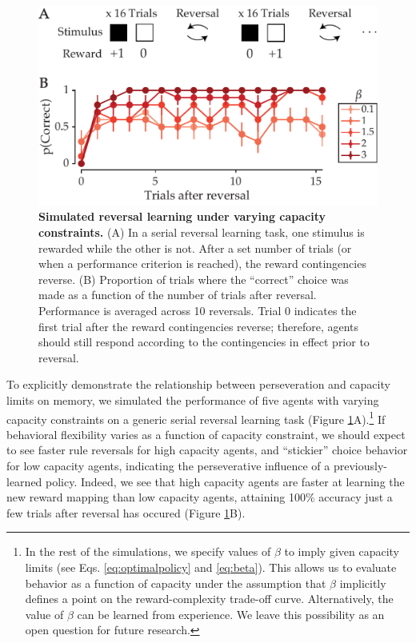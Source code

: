 \documentclass[11pt]{article}
\begin{document}
\begin{figure}
    \centering
    \includegraphics[width=350pt]{figs/reversal.pdf}
    \caption{\textbf{Simulated reversal learning under varying capacity constraints.} (A) In a serial reversal learning task, one stimulus is rewarded while the other is not. After a set number of trials (or when a performance criterion is reached), the reward contingencies reverse. (B) Proportion of trials where the ``correct'' choice was made as a function of the number of trials after reversal. Performance is averaged across 10 reversals. Trial 0 indicates the first trial after the reward contingencies reverse; therefore, agents should still respond according to the contingencies in effect prior to reversal.}
    \label{fig:reversal}
\end{figure}

To explicitly demonstrate the relationship between perseveration and capacity limits on memory, we simulated the performance of five agents with varying capacity constraints on a generic serial reversal learning task (Figure \ref{fig:reversal}A).\footnote{In the rest of the simulations, we specify values of $\beta$ to imply given capacity limits (see Eqs. \ref{eq:optimalpolicy} and \ref{eq:beta}). This allows us to evaluate behavior as a function of capacity under the assumption that $\beta$ implicitly defines a point on the reward-complexity trade-off curve. Alternatively, the value of $\beta$ can be learned from experience. We leave this possibility as an open question for future research.} If behavioral flexibility varies as a function of capacity constraint, we should expect to see faster rule reversals for high capacity agents, and ``stickier'' choice behavior for low capacity agents, indicating the perseverative influence of a previously-learned policy. Indeed, we see that high capacity agents are faster at learning the new reward mapping than low capacity agents, attaining 100\% accuracy just a few trials after reversal has occured (Figure \ref{fig:reversal}B).
\end{document}
